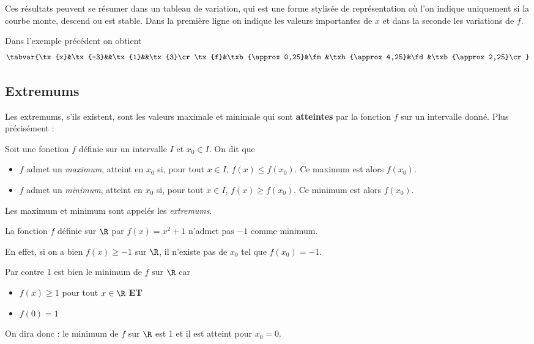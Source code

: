 Ces r\'esultats peuvent se r\'esumer dans un tableau de variation, qui est une forme stylis\'ee de repr\'esentation o\`u l'on indique uniquement si la courbe monte, descend ou est stable. Dans la premi\`ere ligne on indique les valeurs importantes de $x$ et dans la seconde les variations de $f$.

\begin{exemple*} Dans l'exemple pr\'ec\'edent on obtient
$$\tabvar{%
\tx{x}&\tx{-3}&&\tx{1}&&\tx{3}\cr
\tx{f}&\txb{\approx 0,25}&\fm&\txh{\approx 4,25}&\fd&\txb{\approx 2,25}\cr
}$$
\end{exemple*}



\subsection{Extremums}

Les extremums, s'ils existent, sont les valeurs maximale et minimale qui sont \textbf{atteintes} par la fonction $f$ sur un intervalle donn\'e. Plus pr\'ecis\'ement :

\begin{definition}
Soit une fonction $f$ d\'efinie sur un intervalle $I$ et $x_0\in I$. On dit que
\begin{itemize}
	\item $f$ admet un \emph{maximum}, atteint en $x_0$ si, pour tout $x\in I$, $f(x)\leqslant f(x_0)$. Ce maximum est alors $f(x_0)$.
	\item $f$ admet un \emph{minimum}, atteint en $x_0$ si, pour tout $x\in I$, $f(x)\geqslant f(x_0)$. Ce minimum est alors $f(x_0)$.
\end{itemize}
Les maximum et minimum sont appel\'es les \emph{extremums}.
\end{definition}


\begin{exemple*}
La fonction $f$ d\'efinie sur $\R$ par $f(x)=x^2+1$ n'admet pas $-1$ comme minimum.

En effet, si on a bien $f(x)\geqslant -1$ sur $\R$, il n'existe pas de $x_0$ tel que $f(x_0)=-1$.

Par contre 1 est bien le minimum de $f$ sur $\R$ car
\begin{itemize}
	\item $f(x)\geqslant 1$ pour tout $x\in\R$ \textbf{ET}
	\item $f(0)=1$
\end{itemize}

On dira donc : le minimum de $f$ sur $\R$ est 1 et il est atteint pour $x_0=0$.
\end{exemple*}

